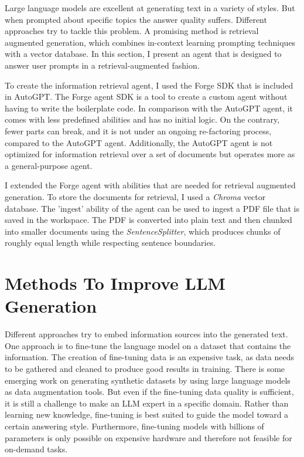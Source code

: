 \documentclass[../main.tex]{subfiles}
\begin{document}
Large language models are excellent at generating text in a variety of styles.
But when prompted about specific topics the answer quality suffers.
Different approaches try to tackle this problem.
A promising method is retrieval augmented generation, which combines in-context learning prompting techniques with a vector database.
In this section, I present an agent that is designed to answer user prompts in a retrieval-augmented fashion.

To create the information retrieval agent,
I used the Forge SDK \autocite{zotero-117} that is included in AutoGPT.
The Forge agent SDK is a tool to create a custom agent without having to write the boilerplate code.
In comparison with the AutoGPT agent, it comes with less predefined abilities and has no initial logic.
On the contrary, fewer parts can break, and it is not under an ongoing re-factoring process,
compared to the AutoGPT agent.
Additionally, the AutoGPT agent is not optimized for information retrieval over a set of documents
but operates more as a general-purpose agent.

I extended the Forge agent with abilities that are needed for retrieval augmented generation.
To store the documents for retrieval, I used a \emph{Chroma} vector database.
The 'ingest' ability of the agent can be used to ingest a PDF file that is saved in the workspace.
The PDF is converted into plain text and then chunked into smaller documents using the \emph{SentenceSplitter},
which produces chunks of roughly equal length while respecting sentence boundaries.

\section{Methods To Improve LLM Generation}

Different approaches try to embed information sources into the generated text.
One approach is to fine-tune the language model on a dataset that contains the information.
The creation of fine-tuning data is an expensive task, as data needs to be gathered and cleaned to produce good results in training.
There is some emerging work on generating synthetic datasets by using large language models as data augmentation tools.
But even if the fine-tuning data quality is sufficient, it is still a challenge to make an LLM expert in a specific domain.
Rather than learning new knowledge, fine-tuning is best suited to guide the model toward a certain answering style.
Furthermore, fine-tuning models with billions of parameters is only possible on expensive hardware and therefore not feasible for on-demand tasks.
\end{document}
